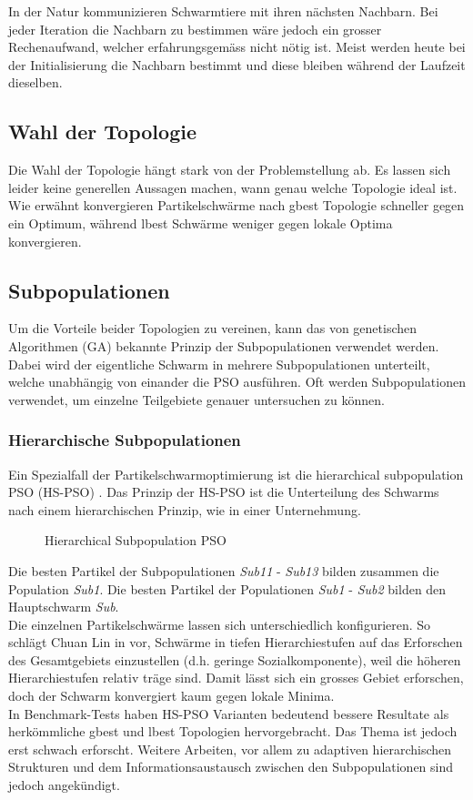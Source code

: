 In der Natur kommunizieren Schwarmtiere mit ihren nächsten Nachbarn. Bei jeder Iteration die Nachbarn zu bestimmen wäre jedoch ein grosser Rechenaufwand, welcher erfahrungsgemäss nicht nötig ist. Meist werden heute bei der Initialisierung die Nachbarn bestimmt und diese bleiben während der Laufzeit dieselben.

\subsection{Wahl der Topologie}
Die Wahl der Topologie hängt stark von der Problemstellung ab. Es lassen sich leider keine generellen Aussagen machen, wann genau welche Topologie ideal ist. Wie erwähnt konvergieren Partikelschwärme nach gbest Topologie schneller gegen ein Optimum, während lbest Schwärme weniger gegen lokale Optima konvergieren.

\subsection{Subpopulationen}
Um die Vorteile beider Topologien zu vereinen, kann das von genetischen Algorithmen (GA) bekannte Prinzip der Subpopulationen verwendet werden. Dabei wird der eigentliche Schwarm in mehrere Subpopulationen unterteilt, welche unabhängig von einander die PSO ausführen. Oft werden Subpopulationen verwendet, um einzelne Teilgebiete genauer untersuchen zu können.


\subsubsection{Hierarchische Subpopulationen}
Ein Spezialfall der Partikelschwarmoptimierung ist die hierarchical subpopulation PSO (HS-PSO) \cite{ChuanLin-HSPSO}. Das Prinzip der HS-PSO ist die Unterteilung des Schwarms nach einem hierarchischen Prinzip, wie in einer Unternehmung.

\begin{figure}[htbp]
	\centering
	
	\caption{Hierarchical Subpopulation PSO}
	\label{hs-pso}
\end{figure}

Die besten Partikel der Subpopulationen \textit{Sub11} - \textit{Sub13} bilden zusammen die Population \textit{Sub1}. Die besten Partikel der Populationen \textit{Sub1} - \textit{Sub2} bilden den Hauptschwarm \textit{Sub}. \\

Die einzelnen Partikelschwärme lassen sich unterschiedlich konfigurieren. So schlägt Chuan Lin in \cite{ChuanLin-HSPSO} vor, Schwärme in tiefen Hierarchiestufen auf das Erforschen des Gesamtgebiets einzustellen (d.h. geringe Sozialkomponente), weil die höheren Hierarchiestufen relativ träge sind. Damit lässt sich ein grosses Gebiet erforschen, doch der Schwarm konvergiert kaum gegen lokale Minima. \\

In Benchmark-Tests haben HS-PSO Varianten bedeutend bessere Resultate als herkömmliche gbest und lbest Topologien hervorgebracht. Das Thema ist jedoch erst schwach erforscht. Weitere Arbeiten, vor allem zu adaptiven hierarchischen Strukturen und dem Informationsaustausch zwischen den Subpopulationen sind jedoch angekündigt.

